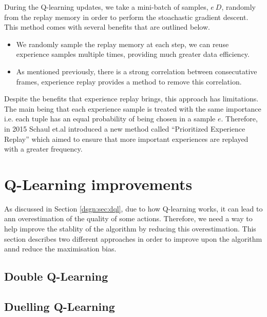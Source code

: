 During the Q-learning updates, we take a mini-batch of samples, $e ~ D$, randomly from the replay memory in order to perform the stoachastic gradient descent. This method comes with several benefits that are outlined below.

\begin{itemize}
	\item We randomly sample the replay memory at each step, we can reuse experience samples multiple times, providing much greater data efficiency.
	\item As mentioned previously, there is a strong correlation between consecutative frames, experience replay provides a method to remove this correlation.
\end{itemize}

Despite the benefits that experience replay brings, this approach has limitations. The main being that each experience sample is treated with the same importance i.e. each tuple has an equal probability of being chosen in a sample $e$. Therefore, in 2015 Schaul et.al \cite{per} introduced a new method called ``Prioritized Experience Replay'' which aimed to ensure that more important experiences are replayed with a greater frequency.

\section{Q-Learning improvements}
\label{dsgn:sec:qlearning:qextra}
As discussed in Section \ref{dsgn:sec:dql}, due to how Q-learning works, it can lead to ann overestimation of the quality of some actions. Therefore, we need a way to help improve the stablity of the algorithm by reducing this overestimation. This section describes two different approaches in order to improve upon the algorithm annd reduce the maximisation bias.

\subsection{Double Q-Learning}
\label{dsgn:sec:qlearning:doubledqn}

\subsection{Duelling Q-Learning}
\label{dsgn:sec:qlearning:dueldqn}
